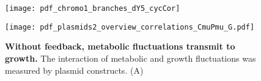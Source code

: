 \clearpage



\begin{figure}
	\centering
	\texttt{[image: pdf\_chromo1\_branches\_dY5\_cycCor]}
	\clearpage %
	\label{fig:XXX:XXX}
\end{figure}	

\clearpage






\begin{figure}
	\centering
	\texttt{[image: pdf\_plasmids2\_overview\_correlations\_CmuPmu\_G.pdf]}
	\caption{ 
		\textbf{Without feedback, metabolic fluctuations transmit to growth.}
		The interaction of metabolic and growth fluctuations was measured by plasmid constructs.
		(A) 
	}
	\label{fig:CRP:plasmidCCs}
\end{figure}



